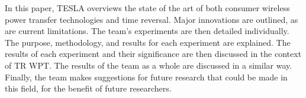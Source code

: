 In this paper, TESLA overviews the state of the art of both consumer wireless
power transfer technologies and time reversal.  Major innovations are outlined,
as are current limitations.  The team’s experiments are then detailed
individually.  The purpose, methodology, and results for each experiment are
explained.  The results of each experiment and their significance are then
discussed in the context of TR WPT.  The results of the team as a whole are
discussed in a similar way.  Finally, the team makes suggestions for future
research that could be made in this field, for the benefit of future
researchers.
